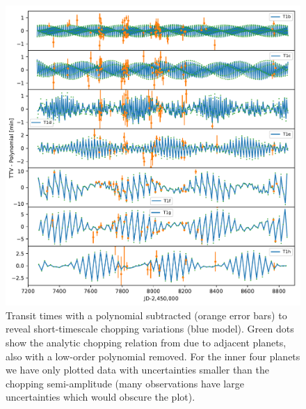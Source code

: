 \documentclass[twocolumn]{aastex63}
\begin{document}
\begin{figure}
    \centering
    \includegraphics[width=\hsize]{figures/T1_chopping.pdf}
    \caption{Transit times with a polynomial subtracted (orange error bars) to reveal short-timescale chopping variations (blue model).  Green dots show the analytic chopping relation from \citet{Agol2005,Deck2015} due to adjacent planets, also with a low-order polynomial removed. For the inner four planets we have
    only plotted data with
    uncertainties smaller than the chopping semi-amplitude  (many observations have large uncertainties which would obscure the plot).}
    \label{fig:chopping}
\end{figure}
\end{document}
